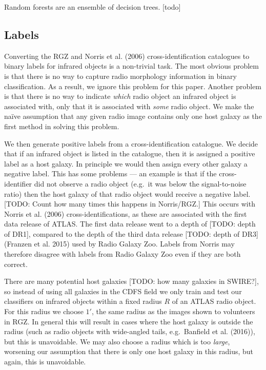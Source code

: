 \documentclass[fleqn,usenatbib,usedcolumn]{mnras}
\begin{document}
    Random forests are an ensemble of decision trees. {[}todo{]}

  \subsection{Labels}\label{labels}

    Converting the RGZ and Norris et al. (2006) cross-identification
    catalogues to binary labels for infrared objects is a non-trivial task.
    The most obvious problem is that there is no way to capture radio
    morphology information in binary classification. As a result, we ignore
    this problem for this paper. Another problem is that there is no way to
    indicate \emph{which} radio object an infrared object is associated
    with, only that it is associated with \emph{some} radio object. We make
    the naïve assumption that any given radio image contains only one host
    galaxy as the first method in solving this problem.

    We then generate positive labels from a cross-identification catalogue.
    We decide that if an infrared object is listed in the catalogue, then it
    is assigned a positive label as a host galaxy. In principle we would
    then assign every other galaxy a negative label. This has some problems
    --- an example is that if the cross-identifier did not observe a radio
    object (e.g.~it was below the signal-to-noise ratio) then the host
    galaxy of that radio object would receive a negative label. {[}TODO:
    Count how many times this happens in Norris/RGZ.{]} This occurs with
    Norris et al. (2006) cross-identifications, as these are associated with
    the first data release of ATLAS. The first data release went to a depth
    of {[}TODO: depth of DR1{]}, compared to the depth of the third data
    release {[}TODO: depth of DR3{]} (Franzen et al. 2015) used by Radio
    Galaxy Zoo. Labels from Norris may therefore disagree with labels from
    Radio Galaxy Zoo even if they are both correct.

    There are many potential host galaxies {[}TODO: how many galaxies in
    SWIRE?{]}, so instead of using all galaxies in the CDFS field we only
    train and test our classifiers on infrared objects within a fixed radius
    \(R\) of an ATLAS radio object. For this radius we choose \(1'\), the
    same radius as the images shown to volunteers in RGZ. In general this
    will result in cases where the host galaxy is outside the radius (such
    as radio objects with wide-angled tails, e.g.~Banfield et al. (2016)),
    but this is unavoidable. We may also choose a radius which is too
    \emph{large}, worsening our assumption that there is only one host
    galaxy in this radius, but again, this is unavoidable.
\end{document}
